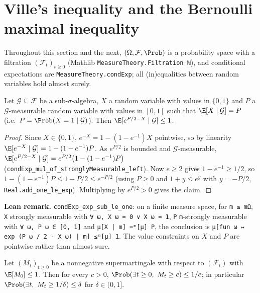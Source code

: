 \section{Ville's inequality and the Bernoulli maximal inequality}
\label{sec:pconc_ville}

Throughout this section and the next, $(\Omega, \mathcal F, \Prob)$ is a probability space
with a filtration $(\mathcal F_t)_{t \ge 0}$ (Mathlib \texttt{MeasureTheory.Filtration ℕ}),
and conditional expectations are \texttt{MeasureTheory.condExp}; all (in)equalities between
random variables hold almost surely.

\begin{lemma}\label{lem:bernoulli_mgf_step}
\leanok
Let $\mathcal G \subseteq \mathcal F$ be a sub-$\sigma$-algebra, $X$ a random variable with
values in $\{0, 1\}$ and $P$ a $\mathcal G$-measurable random variable with values in $[0, 1]$
such that $\E[X \mid \mathcal G] = P$ (i.e.\ $P = \Prob(X = 1 \mid \mathcal G)$). Then
$\E[e^{P/2 - X} \mid \mathcal G] \le 1$.
\end{lemma}

\begin{proof}
\leanok
Since $X \in \{0, 1\}$, $e^{-X} = 1 - (1 - e^{-1}) X$ pointwise, so by linearity
$\E[e^{-X} \mid \mathcal G] = 1 - (1 - e^{-1}) P$. As $e^{P/2}$ is bounded and
$\mathcal G$-measurable, $\E[e^{P/2 - X} \mid \mathcal G] = e^{P/2}\big(1 - (1 - e^{-1})P\big)$
(\texttt{condExp\_mul\_of\_stronglyMeasurable\_left}). Now $e \ge 2$ gives $1 - e^{-1} \ge 1/2$,
so $1 - (1 - e^{-1})P \le 1 - P/2 \le e^{-P/2}$ (using $P \ge 0$ and $1 + y \le e^y$ with
$y = -P/2$, \texttt{Real.add\_one\_le\_exp}). Multiplying by $e^{P/2} > 0$ gives the claim.
\end{proof}

\textbf{Lean remark.} \texttt{condExp\_exp\_sub\_le\_one}: on a finite measure space, for
\texttt{m ≤ mΩ}, \texttt{X} strongly measurable with \texttt{∀ ω, X ω = 0 ∨ X ω = 1},
\texttt{P} \texttt{m}-strongly measurable with \texttt{∀ ω, P ω ∈ [0, 1]} and
\texttt{μ[X | m] =ᵐ[μ] P}, the conclusion is
\texttt{μ[fun ω ↦ exp (P ω / 2 - X ω) | m] ≤ᵐ[μ] 1}. The value constraints on $X$ and $P$ are
pointwise rather than almost sure.

\begin{lemma}\label{lem:ville}
\leanok
Let $(M_t)_{t \ge 0}$ be a nonnegative supermartingale with respect to $(\mathcal F_t)$ with
$\E[M_0] \le 1$. Then for every $c > 0$, $\Prob(\exists t \ge 0,\ M_t \ge c) \le 1/c$; in
particular $\Prob(\exists t,\ M_t \ge 1/\delta) \le \delta$ for $\delta \in (0, 1]$.
\end{lemma}

